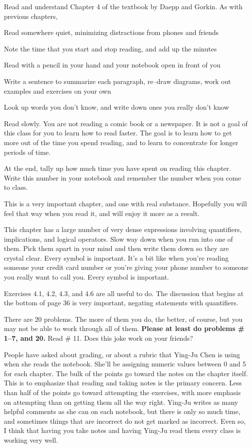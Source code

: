 
Read and understand Chapter 4 of the textbook by Daepp and Gorkin.
As with previous chapters,
{\small
\blist{0.0in}
\item Read somewhere quiet, minimizing distractions from phones and friends
\item Note the time that you start and stop reading, and add up the minutes
\item Read with a pencil in your hand and your notebook open in front of you
\item Write a sentence to summarize each paragraph, re--draw diagrams, work out examples and exercises on your own
\item Look up words you don't know, and write down ones you really don't know
\item Read slowly.  You are not reading a comic book or a newspaper.  It is not a goal of this class for you to learn how to read faster.  The goal is to learn how to get more out of the time you spend reading, and to learn to concentrate for longer periods of time.
\item At the end, tally up how much time you have spent on reading this chapter.
Write this number in your notebook and remember the number when you come to class.
\elist
}

This is a very important chapter, and one with real substance.  Hopefully you will feel that way when you read it, and will enjoy it more as a result.

This chapter has a large number of very dense expressions involving quantifiers, implications, and logical operators.  Slow way down when you run into one of them.  Pick them apart in your mind and then write them down so they are crystal clear.  Every symbol is important.  It's a bit like when you're reading someone your credit card number or you're giving your phone number to someone you really want to call you.  Every symbol is important.

Exercises 4.1, 4.2, 4.3, and 4.6 are all useful to do.
The discussion that begins at the bottom of page 36 is very important, negating statements with quantifiers.

There are 20 problems.  The more of them you do, the better, of course, but you may not be able to work through all of them.  {\bf Please at least do problems \# 1--7, and 20.}  Read \# 11.  Does this joke work on your friends?

People have asked about grading, or about a rubric that Ying-Ju Chen is using when she reads the notebook.
She'll be assigning numeric values between 0 and 5 for each chapter.
The bulk of the points go toward the notes on the chapter itself.
This is to emphasize that reading and taking notes is the primary concern.
Less than half of the points go toward attempting the exercises, with more emphasis on attempting than on getting them all the way right.
Ying-Ju writes as many helpful comments as she can on each notebook, but there is only so much time, and sometimes things that are incorrect do not get marked as incorrect.
Even so, I think that having you take notes and having Ying-Ju read them every class is working very well.

